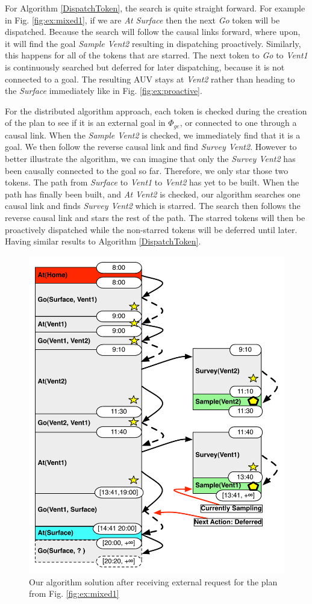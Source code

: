 For Algorithm \ref{DispatchToken}, the search is quite straight
forward. For example in Fig. \ref{fig:ex:mixed1}, if we are {\em At
Surface} then the next {\em Go} token will be dispatched. Because the
search will follow the causal links forward, where upon, it will find
the goal {\em Sample Vent2} resulting in dispatching proactively.
Similarly, this happens for all of the tokens that are starred. The
next token to {\em Go} to {\em Vent1} is continuously searched but deferred for later dispatching,
because it is not connected to a goal. The resulting
AUV stays at {\em Vent2} rather than heading to the {\em Surface}
immediately like in Fig. \ref{fig:ex:proactive}.

For the distributed algorithm approach, each token is checked during
the creation of the plan to see if it is an external goal in
$\Phi_{ge}$, or connected to one through a causal link. When the {\em
Sample Vent2} is checked, we immediately find that it is a goal. We then
follow the reverse causal link and find {\em Survey Vent2}.  However to
better illustrate the algorithm, we can imagine that only the {\em Survey
Vent2} has been causally connected to the goal so far. Therefore, we
only star those two tokens. The path from {\em Surface} to {\em Vent1}
to {\em Vent2} has yet to be built. When the path has finally been
built, and {\em At Vent2} is checked, our algorithm searches one
causal link and finds {\em Survey Vent2} which is starred. The search
then follows the reverse causal link and stars the rest of the
path. The starred tokens will then be proactively dispatched while the
non-starred tokens will be deferred until later. Having similar
results to Algorithm \ref{DispatchToken}.

\begin{figure}
  \centering
  \includegraphics[width=0.8\columnwidth]{figs/example_MixedUpdate}
  \caption{Our algorithm solution after receiving external request for the plan from Fig. \ref{fig:ex:mixed1}}
  \label{fig:ex:mixed2}
\end{figure}

